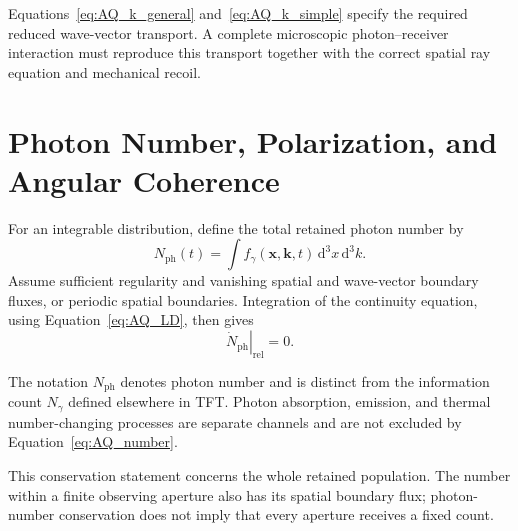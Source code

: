 Equations~\eqref{eq:AQ_k_general} and~\eqref{eq:AQ_k_simple} specify the
required reduced wave-vector transport. A complete microscopic
photon--receiver interaction must reproduce this transport together with the
correct spatial ray equation and mechanical recoil.


\section{Photon Number, Polarization, and Angular Coherence}

For an integrable distribution, define the total retained photon number by
\[
    N_{\mathrm{ph}}(t)
    =\int f_{\gamma}(\mathbf x,\mathbf k,t)
       \,\mathrm d^3x\,\mathrm d^3k.
\]
Assume sufficient regularity and vanishing spatial and wave-vector boundary
fluxes, or periodic spatial boundaries. Integration of the continuity
equation, using Equation~\eqref{eq:AQ_LD}, then gives
\begin{equation}
    \boxed{
    \left.\dot N_{\mathrm{ph}}\right|_{\mathrm{rel}}
    =
    0.
    }
    \label{eq:AQ_number}
\end{equation}

The notation $N_{\mathrm{ph}}$ denotes photon number and is distinct from the
information count $N_{\gamma}$ defined elsewhere in TFT. Photon absorption,
emission, and thermal number-changing processes are separate channels and are
not excluded by Equation~\eqref{eq:AQ_number}.

This conservation statement concerns the whole retained population. The
number within a finite observing aperture also has its spatial boundary
flux; photon-number conservation does not imply that every aperture
receives a fixed count.

